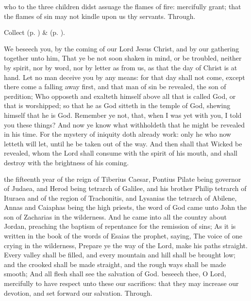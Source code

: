 
\collect
{} who to the three children didst assuage the flames of fire: mercifully grant; that the flames of sin may not kindle upon us thy servants. Through.

\begin{rubric}
     Collect  (p. \pageref{AdventICollect}) \&   (p. \pageref{SPMaryInAdvent}).
\end{rubric}

 We beseech you, by the coming of our Lord Jesus Christ, and by our gathering together unto him, That ye be not soon shaken in mind, or be troubled, neither by spirit, nor by word, nor by letter as from us, as that the day of Christ is at hand. Let no man deceive you by any means: for that day shall not come, except there come a falling away first, and that man of sin be revealed, the son of perdition; Who opposeth and exalteth himself above all that is called God, or that is worshipped; so that he as God sitteth in the temple of God, shewing himself that he is God. Remember ye not, that, when I was yet with you, I told you these things? And now ye know what withholdeth that he might be revealed in his time. For the mystery of iniquity doth already work: only he who now letteth will let, until he be taken out of the way. And then shall that Wicked be revealed, whom the Lord shall consume with the spirit of his mouth, and shall destroy with the brightness of his coming.


 the fifteenth year of the reign of Tiberius Caesar, Pontius Pilate being governor of Judaea, and Herod being tetrarch of Galilee, and his brother Philip tetrarch of Ituraea and of the region of Trachonitis, and Lysanias the tetrarch of Abilene, Annas and Caiaphas being the high priests, the word of God came unto John the son of Zacharias in the wilderness. And he came into all the country about Jordan, preaching the baptism of repentance for the remission of sins; As it is written in the book of the words of Esaias the prophet, saying, The voice of one crying in the wilderness, Prepare ye the way of the Lord, make his paths straight. Every valley shall be filled, and every mountain and hill shall be brought low; and the crooked shall be made straight, and the rough ways shall be made smooth; And all flesh shall see the salvation of God.
\secret
{} beseech thee, O Lord, mercifully to have respect unto these our sacrifices: that they may increase our devotion, and set forward our salvation. Through.


